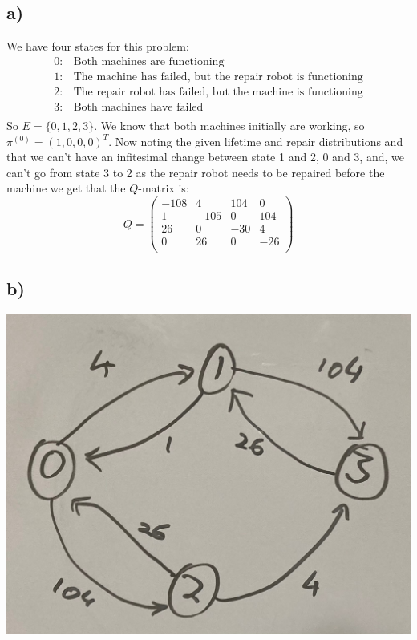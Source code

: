 \documentclass{article}
\begin{document}
\subsection*{a)}
We have four states for this problem:
\begin{align*}
0:&\text{Both machines are functioning}\\
1:&\text{The machine has failed, but the repair robot is functioning}\\
2:&\text{The repair robot has failed, but the machine is functioning}\\
3:&\text{Both machines have failed}\\
\end{align*}
So $E=\{0,1,2,3\}$. We know that both machines initially are working, so $\pi^{(0)}=(1,0,0,0)^T$. Now noting the given lifetime and repair distributions and that we can't have an infitesimal change between state 1 and 2, 0 and 3, and, we can't go from state 3 to 2 as the repair robot needs to be repaired before the machine we get that the $Q$-matrix is:
$$Q=\begin{pmatrix}
-108 & 4 & 104 & 0\\
1 & -105 & 0 & 104\\
26 & 0 & -30 & 4\\
0 & 26 & 0 & -26\\
\end{pmatrix}$$
\subsection*{b)}
\includegraphics[scale=0.2]{CTMC.jpeg}
\end{document}
